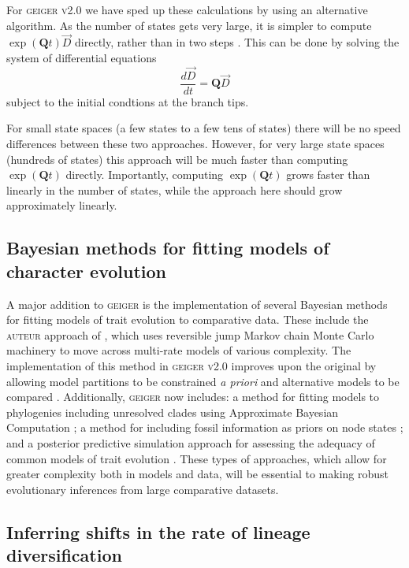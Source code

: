 For \textsc{geiger v2.0} we have sped up these calculations by using an alternative algorithm.
As the number of states gets very large, it is simpler to compute
$\exp(\mathbf{Q}t) \vec D$ directly, rather than in two steps
\citep{Sidje-1998-130}.  This can be done by solving the system of
differential equations
\begin{equation}
\frac{d \vec D}{dt} = \mathbf{Q} \vec D
\end{equation}
subject to the initial condtions at the branch tips.

For small state spaces (a few states to a few tens of states) there
will be no speed differences between these two approaches.  However,
for very large state spaces (hundreds of states) this approach will be
much faster than computing $\exp(\mathbf{Q} t)$ directly.
Importantly, computing $\exp(\mathbf{Q} t)$ grows faster than linearly
in the number of states, while the approach here should grow
approximately linearly.


\subsection{Bayesian methods for fitting models of character evolution}

A major addition to \textsc{geiger} is the implementation of several Bayesian methods for fitting models of trait evolution to comparative data. These include the \textsc{auteur} approach of \citet{Eastman2011}, which uses reversible jump Markov chain Monte Carlo machinery \citep{Green1995} to move across multi-rate  models of various complexity. The implementation of this method in \textsc{geiger v2.0} improves upon the original by allowing model partitions to be constrained \emph{a priori} and alternative models to be compared \citep{Eastmanjump}. Additionally, \textsc{geiger} now includes: a method for fitting models to phylogenies including unresolved clades using Approximate Bayesian Computation \citep[\textsc{mecca};][]{Slater2012MECCA}; a method for including fossil information as priors on node states \citep{Slater2012Fossil}; and a posterior predictive simulation approach for assessing the adequacy of common models of trait evolution \citep{SlaterPennell}. These types of approaches, which allow for greater complexity both in models and data, will be essential to making robust evolutionary inferences from large comparative datasets.  


\subsection{Inferring shifts in the rate of lineage diversification}

